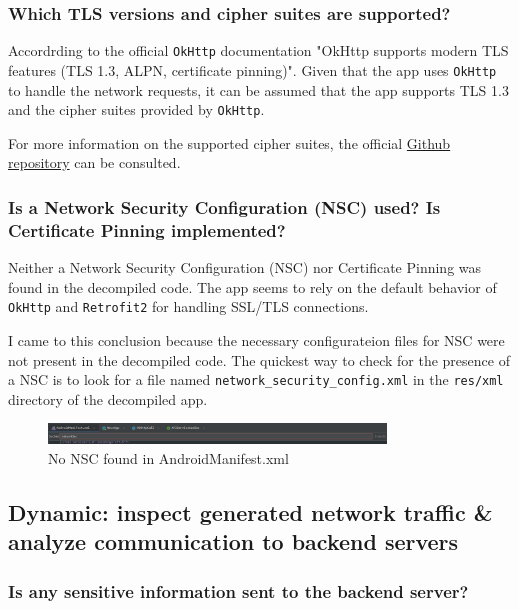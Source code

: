 \documentclass[12pt,a4paper]{article}
\begin{document}
\subsubsection{Which TLS versions and cipher suites are supported?}

Accordrding to the official \texttt{OkHttp} documentation "OkHttp supports modern TLS features (TLS 1.3, ALPN, certificate pinning)".
Given that the app uses \texttt{OkHttp} to handle the network requests, it can be assumed that the app supports TLS 1.3 and the cipher suites provided by \texttt{OkHttp}.

For more information on the supported cipher suites, the official \href{https://github.com/square/okhttp}{Github repository} can be consulted.

\subsubsection{Is a Network Security Configuration (NSC) used? Is Certificate Pinning implemented?}

Neither a Network Security Configuration (NSC) nor Certificate Pinning was found in the decompiled code. The app seems to rely on the default behavior of \texttt{OkHttp} and \texttt{Retrofit2} for handling SSL/TLS connections.

I came to this conclusion because the necessary configurateion files for NSC were not present in the decompiled code. The quickest way to check for the presence of a NSC is to look for a file named \texttt{network\_security\_config.xml} in the \texttt{res/xml} directory of the decompiled app.

\begin{figure}[H]
\centering
\includegraphics[width=0.8\textwidth]{./screenshots/no_nsc.png}
\caption{No NSC found in AndroidManifest.xml}
\end{figure}


\subsection{Dynamic: inspect generated network traffic \& analyze communication to backend servers}

\subsubsection{Is any sensitive information sent to the backend server?}
\end{document}
